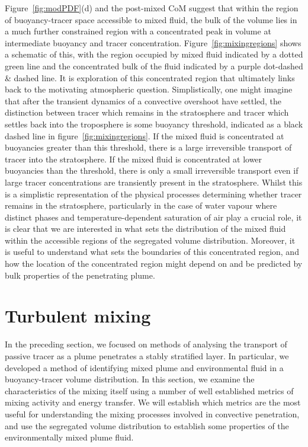 \documentclass[a4paper]{article}
\begin{document}
Figure~\ref{fig:modPDF}(d) and the post-mixed CoM suggest that within the region of buoyancy-tracer space
accessible to mixed fluid, the bulk of the volume lies in a much further constrained region with a
concentrated peak in volume at intermediate buoyancy and tracer concentration. Figure~\ref{fig:mixingregions}
shows a schematic of this, with the region occupied by mixed fluid indicated by a dotted green line and the
concentrated bulk of the fluid indicated by a purple dot-dashed \& dashed line. It is exploration of this
concentrated region that ultimately links back to the motivating atmospheric question. Simplistically, one
might imagine that after the transient dynamics of a convective overshoot have settled, the distinction
between tracer which remains in the stratosphere and tracer which settles back into the troposphere is some
buoyancy threshold, indicated as a black dashed line in figure~\ref{fig:mixingregions}. If the mixed fluid is
concentrated at buoyancies greater than this threshold, there is a large irreversible transport of tracer into
the stratosphere. If the mixed fluid is concentrated at lower buoyancies than the threshold, there is only a
small irreversible transport even if large tracer concentrations are transiently present in the stratosphere.
Whilst this is a simplistic representation of the physical processes determining whether tracer remains in the
stratosphere, particularly in the case of water vapour where distinct phases and temperature-dependent
saturation of air play a crucial role, it is clear that we are interested in what sets the distribution of the
mixed fluid within the accessible regions of the segregated volume distribution. Moreover, it is useful to
understand what sets the boundaries of this concentrated region, and how the location of the concentrated
region might depend on and be predicted by bulk properties of the penetrating plume.


\section{Turbulent mixing}
\label{sec:turbmix}
In the preceding section, we focused on methods of analysing the transport of passive tracer as a plume
penetrates a stably stratified layer. In particular, we developed a method of identifying mixed plume and
environmental fluid in a buoyancy-tracer volume distribution. In this section, we examine the characteristics
of the mixing itself using a number of well established metrics of mixing activity and energy transfer. We
will establish which metrics are the most useful for understanding the mixing processes involved in convective
penetration, and use the segregated volume distribution to establish some properties of the
environmentally mixed plume fluid.
\end{document}
